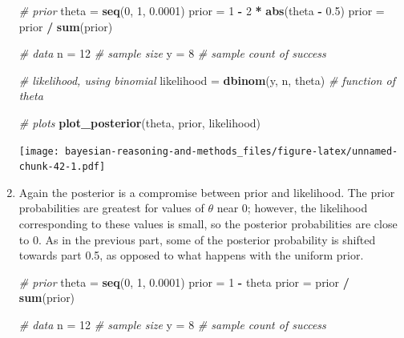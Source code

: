 \documentclass[
]{book}
\newenvironment{Shaded}{\begin{snugshade}}{\end{snugshade}}
\newcommand{\CommentTok}[1]{\textcolor[rgb]{0.56,0.35,0.01}{\textit{#1}}}
\newcommand{\DecValTok}[1]{\textcolor[rgb]{0.00,0.00,0.81}{#1}}
\newcommand{\FloatTok}[1]{\textcolor[rgb]{0.00,0.00,0.81}{#1}}
\newcommand{\KeywordTok}[1]{\textcolor[rgb]{0.13,0.29,0.53}{\textbf{#1}}}
\newcommand{\NormalTok}[1]{#1}
\newcommand{\OperatorTok}[1]{\textcolor[rgb]{0.81,0.36,0.00}{\textbf{#1}}}
\newcommand{\StringTok}[1]{\textcolor[rgb]{0.31,0.60,0.02}{#1}}
\theoremstyle{definition}
\theoremstyle{definition}
\theoremstyle{definition}
\theoremstyle{remark}
\begin{document}
\begin{enumerate}
\begin{Shaded}
\begin{Highlighting}[]
\CommentTok{\# prior}
\NormalTok{theta =}\StringTok{ }\KeywordTok{seq}\NormalTok{(}\DecValTok{0}\NormalTok{, }\DecValTok{1}\NormalTok{, }\FloatTok{0.0001}\NormalTok{)}
\NormalTok{prior =}\StringTok{ }\DecValTok{1} \OperatorTok{{-}}\StringTok{ }\DecValTok{2} \OperatorTok{*}\StringTok{ }\KeywordTok{abs}\NormalTok{(theta }\OperatorTok{{-}}\StringTok{ }\FloatTok{0.5}\NormalTok{)}
\NormalTok{prior =}\StringTok{ }\NormalTok{prior }\OperatorTok{/}\StringTok{ }\KeywordTok{sum}\NormalTok{(prior)}

\CommentTok{\# data}
\NormalTok{n =}\StringTok{ }\DecValTok{12} \CommentTok{\# sample size}
\NormalTok{y =}\StringTok{ }\DecValTok{8} \CommentTok{\# sample count of success}

\CommentTok{\# likelihood, using binomial}
\NormalTok{likelihood =}\StringTok{ }\KeywordTok{dbinom}\NormalTok{(y, n, theta) }\CommentTok{\# function of theta}


\CommentTok{\# plots}
\KeywordTok{plot\_posterior}\NormalTok{(theta, prior, likelihood)}
\end{Highlighting}
\end{Shaded}

  \texttt{[image: bayesian-reasoning-and-methods\_files/figure-latex/unnamed-chunk-42-1.pdf]}
\item
  Again the posterior is a compromise between prior and likelihood. The prior probabilities are greatest for values of \(\theta\) near 0; however, the likelihood corresponding to these values is small, so the posterior probabilities are close to 0. As in the previous part, some of the posterior probability is shifted towards part 0.5, as opposed to what happens with the uniform prior.

\begin{Shaded}
\begin{Highlighting}[]
\CommentTok{\# prior}
\NormalTok{theta =}\StringTok{ }\KeywordTok{seq}\NormalTok{(}\DecValTok{0}\NormalTok{, }\DecValTok{1}\NormalTok{, }\FloatTok{0.0001}\NormalTok{)}
\NormalTok{prior =}\StringTok{ }\DecValTok{1} \OperatorTok{{-}}\StringTok{ }\NormalTok{theta}
\NormalTok{prior =}\StringTok{ }\NormalTok{prior }\OperatorTok{/}\StringTok{ }\KeywordTok{sum}\NormalTok{(prior)}

\CommentTok{\# data}
\NormalTok{n =}\StringTok{ }\DecValTok{12} \CommentTok{\# sample size}
\NormalTok{y =}\StringTok{ }\DecValTok{8} \CommentTok{\# sample count of success}


\end{Highlighting}
\end{Shaded}
\end{enumerate}
\end{document}
